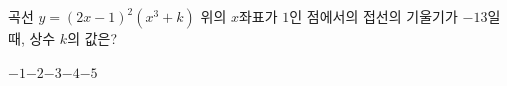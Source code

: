 곡선 $y=(2x-1)^2(x^3+k)$ 위의 $x$좌표가 $1$인 점에서의 접선의 기울기가 $-13$일 때, 상수 $k$의 값은?
\begin{choices32}{$-1$}{$-2$}{$-3$}{$-4$}{$-5$}\end{choices32}
